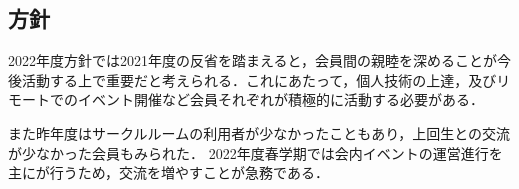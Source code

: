 \subsection*{\newGradeIfKouki{}\secondGrade{}方針}

2022年度\newGradeIfKouki{}\secondGrade{}方針では2021年度の反省を踏まえると，会員間の親睦を深めることが今後活動する上で重要だと考えられる．これにあたって，個人技術の上達，及びリモートでのイベント開催など会員それぞれが積極的に活動する必要がある．

また昨年度はサークルルームの利用者が少なかったこともあり，上回生との交流が少なかった会員もみられた．
2022年度春学期では会内イベントの運営進行を主に\secondGrade{}が行うため，交流を増やすことが急務である．

